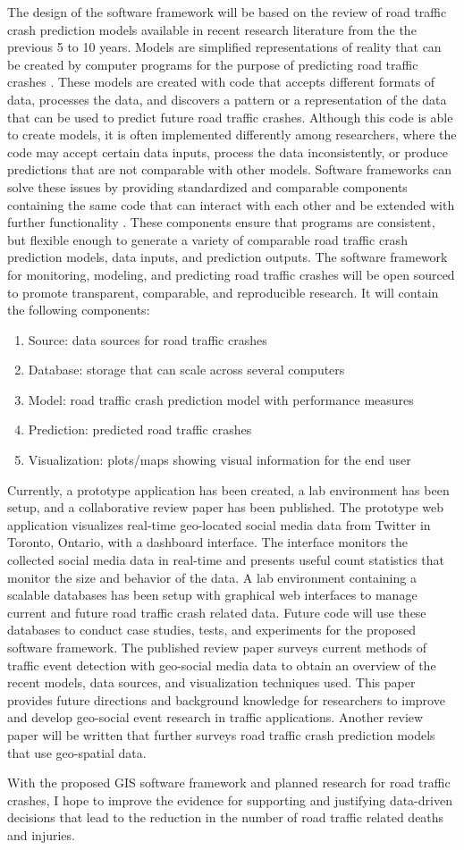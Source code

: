 The design of the software framework will be based on the review of road traffic crash prediction models available in recent research literature from the the previous 5 to 10 years. Models are simplified representations of reality that can be created by computer programs for the purpose of predicting road traffic crashes \cite{rothenberg1989model}. These models are created with code that accepts different formats of data, processes the data, and discovers a pattern or a representation of the data that can be used to predict future road traffic crashes. Although this code is able to create models, it is often implemented differently among researchers, where the code may accept certain data inputs, process the data inconsistently, or produce predictions that are not comparable with other models. Software frameworks can solve these issues by providing standardized and comparable components containing the same code that can interact with each other and be extended with further functionality \cite{edwin2014softwareframeworks}. These components ensure that programs are consistent, but flexible enough to generate a variety of comparable road traffic crash prediction models, data inputs, and prediction outputs. The software framework for monitoring, modeling, and predicting road traffic crashes will be open sourced to promote transparent, comparable, and reproducible research. It will contain the following components:

\begin{enumerate}[label=\alph*)]
	\item Source: data sources for road traffic crashes
	\item Database: storage that can scale across several computers
	\item Model: road traffic crash prediction model with performance measures
	\item Prediction: predicted road traffic crashes
	\item Visualization: plots/maps showing visual information for the end user
\end{enumerate}

Currently, a prototype application has been created, a lab environment has been setup, and a
collaborative review paper has been published. The prototype web application visualizes real-time geo-located social media data from Twitter in Toronto, Ontario, with a dashboard interface. The interface monitors the collected social media data in real-time and presents useful count statistics that monitor the size and behavior of the data. A lab environment containing a scalable databases has been setup with graphical web interfaces to manage current and future road traffic crash related data. Future code will use these databases to conduct case studies, tests, and experiments for the proposed software framework. The published review paper surveys current methods of traffic event detection with geo-social media data to obtain an overview of the recent models, data sources, and visualization techniques used. This paper provides future directions and background knowledge for researchers to improve and develop geo-social event research in traffic applications. Another review paper will be written that further surveys road traffic crash prediction models that use geo-spatial data.

With the proposed GIS software framework and planned research for road traffic crashes, I hope to improve the evidence for supporting and justifying data-driven decisions that lead to the reduction in the number of road traffic related deaths and injuries.
